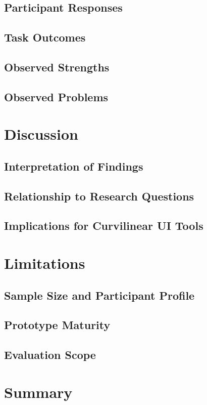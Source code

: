 \subsection{Participant Responses}
\subsection{Task Outcomes}
\subsection{Observed Strengths}
\subsection{Observed Problems}

\section{Discussion}
\subsection{Interpretation of Findings}
\subsection{Relationship to Research Questions}
\subsection{Implications for Curvilinear UI Tools}

\section{Limitations}
\subsection{Sample Size and Participant Profile}
\subsection{Prototype Maturity}
\subsection{Evaluation Scope}

\section{Summary}
